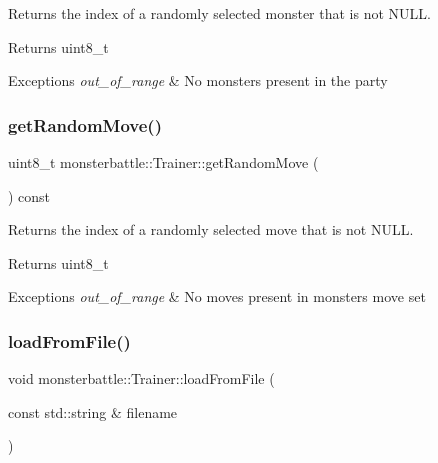 Returns the index of a randomly selected monster that is not N\+U\+LL. 

\begin{DoxyReturn}{Returns}
uint8\+\_\+t
\end{DoxyReturn}

\begin{DoxyExceptions}{Exceptions}
{\em out\+\_\+of\+\_\+range} & No monsters present in the party \\
\hline
\end{DoxyExceptions}
\mbox{\label{classmonsterbattle_1_1Trainer_a02371052b251c3fb1eaa9fc2b1cc1e36}} 
\subsubsection{\texorpdfstring{get\+Random\+Move()}{getRandomMove()}}
{\footnotesize\ttfamily uint8\+\_\+t monsterbattle\+::\+Trainer\+::get\+Random\+Move (\begin{DoxyParamCaption}{ }\end{DoxyParamCaption}) const}



Returns the index of a randomly selected move that is not N\+U\+LL. 

\begin{DoxyReturn}{Returns}
uint8\+\_\+t
\end{DoxyReturn}

\begin{DoxyExceptions}{Exceptions}
{\em out\+\_\+of\+\_\+range} & No moves present in monster\textquotesingle{}s move set \\
\hline
\end{DoxyExceptions}
\mbox{\label{classmonsterbattle_1_1Trainer_a6386eb812b206577976c32dc019ea264}} 
\subsubsection{\texorpdfstring{load\+From\+File()}{loadFromFile()}}
{\footnotesize\ttfamily void monsterbattle\+::\+Trainer\+::load\+From\+File (\begin{DoxyParamCaption}\item[{const std\+::string \&}]{filename }\end{DoxyParamCaption})}



